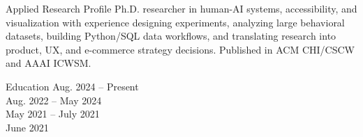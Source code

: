 \documentclass{resume} %
\begin{document}
\footnotesize

\begin{rSection}{Applied Research Profile}
Ph.D. researcher in human-AI systems, accessibility, and visualization with experience designing experiments, analyzing large behavioral datasets, building Python/SQL data workflows, and translating research into product, UX, and e-commerce strategy decisions. Published in ACM CHI/CSCW and AAAI ICWSM.
\end{rSection}

\begin{rSection}{Education}
{\hfill{Aug. 2024 -- Present}}\\
{\hfill{Aug. 2022 -- May 2024}}\\
{\hfill{May 2021 -- July 2021}}\\
{\hfill{June 2021}}\\
\end{rSection}
\end{document}
